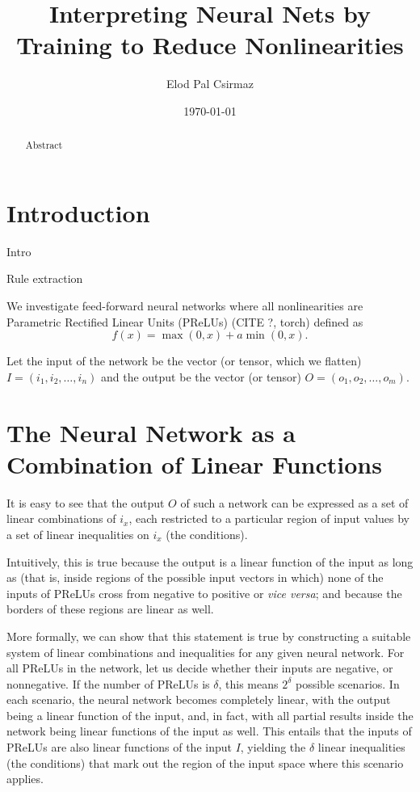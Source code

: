 \documentclass{article}[12pt]
\title{Interpreting Neural Nets by Training to Reduce Nonlinearities}
\author{Elod Pal Csirmaz}
\date{\today}
\begin{document}
\maketitle

\begin{abstract}
Abstract
\end{abstract}

\section{Introduction}

Intro

Rule extraction

We investigate feed-forward neural networks
where all nonlinearities are Parametric Rectified Linear Units (PReLUs)
(CITE ?, torch) %
defined as
\[ f(x) = \max(0, x) + a \min(0, x). \]

Let the input of the network be the vector (or tensor, which we flatten) $I=(i_1, i_2, \ldots, i_n)$
and the output be the vector (or tensor) $O=(o_1, o_2, \ldots, o_m)$.

\section{The Neural Network as a Combination of Linear Functions}

It is easy to see that the output $O$ of such a network can be expressed
as a set of linear combinations of $i_x$, each restricted to a particular region of input values
by a set of linear inequalities on $i_x$ (the conditions).

Intuitively, this is true because the output is a linear function of the input
as long as (that is, inside regions of the possible input vectors in which) none of the inputs of PReLUs
cross from negative to positive or \emph{vice versa}; and because the borders of these regions
are linear as well.

More formally, we can show that this statement is true by constructing a suitable
system of linear combinations and inequalities for any given neural network.
For all PReLUs in the network, let us decide whether their inputs are negative, or nonnegative.
If the number of PReLUs is $\delta$, this means $2^\delta$ possible scenarios.
In each scenario, the neural network becomes completely linear, with the output being a linear function of the input,
and, in fact, with all partial results inside the network being linear functions of the input as well.
This entails that the inputs of PReLUs are also linear functions of the input $I$, yielding
the $\delta$ linear inequalities (the conditions) that mark out the region of the input space where this scenario applies.
\end{document}
